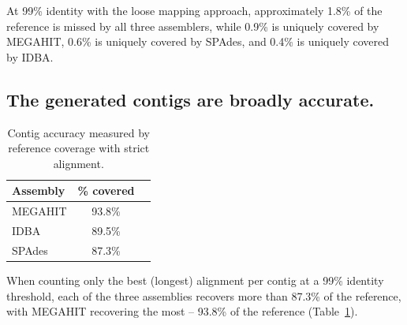 \documentclass[10pt,a4paper,twocolumn]{article}
\begin{document}
At 99\% identity with the loose mapping approach, approximately 1.8\%
of the reference is missed by all three assemblers, while 0.9\% is
uniquely covered by MEGAHIT, 0.6\% is uniquely covered by SPAdes, and
0.4\% is uniquely covered by IDBA.


%
%



\subsection*{The generated contigs are broadly accurate.} 



\begin{table}[!h]
\centering
\caption{Contig accuracy measured by reference coverage with strict alignment.}
\begin{tabular}{|l|c|c|}\hline
\textbf{Assembly} & \textbf {\% covered}
  \\ \hline
MEGAHIT & 93.8\% \\ \hline
IDBA & 89.5\% \\ \hline
SPAdes &  87.3\% \\ \hline
\end{tabular}
\label{table:contig-accuracy}
\end{table}

When counting only the best (longest) alignment per contig at a 99\%
identity threshold, each of the three assemblies recovers more than 87.3\% of the
reference, with MEGAHIT recovering the most -- 93.8\% of the reference
(Table~\ref{table:contig-accuracy}).
\end{document}
